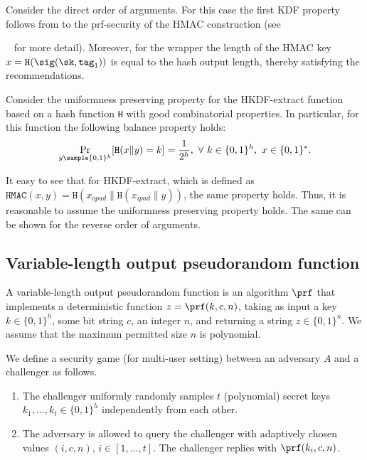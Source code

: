\documentclass{article}
\begin{document}
Consider the direct order of arguments. For this case the first KDF property follows from to the prf-security of the HMAC construction (see{~\cite{BellareCK1996} for more detail). Moreover, for the wrapper the length of the HMAC key $x = \texttt{H}(\sig (\sk, \texttt{tag}_1))$ is equal to the hash output length, thereby satisfying the recommendations.    
	
	Consider the uniformness preserving property for the HKDF-extract function based on a hash function \texttt{H} with good combinatorial properties. In particular, for this function the following balance property holds:	
$$\Pr_{y \sample \{0,1\}^h}[ \texttt{H} (x\|y) = k ] = \frac{1}{2^h},\ \forall\ k \in \{0,1\}^h,\ x \in \{0,1\}^*.$$

It easy to see that for HKDF-extract, which is defined as $\texttt{HMAC} (x,y) = \texttt{H}(x_{opad}\|\texttt{H}(x_{ipad}\|y))$, the same property holds. Thus, it is reasonable to assume the uniformness preserving property holds. The same can be shown for the reverse order of arguments.


\subsection{Variable-length output pseudorandom function} \label{PRFdef}


A variable-length output pseudorandom function is an algorithm $\prf$ that implements a deterministic function $z=\prf(k, c, n)$, taking as input a key $k \in \{0,1\}^h$, some bit string $c$, an integer $n$, and returning a string $z \in \{0, 1 \}^{n}$. We assume that the maximum permitted size $n$ is polynomial. %

We define a security game (for multi-user setting) between an adversary $A$ and a challenger as follows.

\begin{enumerate}
	\item The challenger uniformly randomly samples $t$ (polynomial) secret keys $k_1,\ldots,k_t \in \{0,1\}^h$ independently from each other.
	
	\item The adversary is allowed to query the challenger with adaptively chosen values $(i,c,n)$, $i \in [1,\ldots,t]$. The challenger replies with $\prf(k_i, c,n)$.
	

\end{enumerate}}
\end{document}
